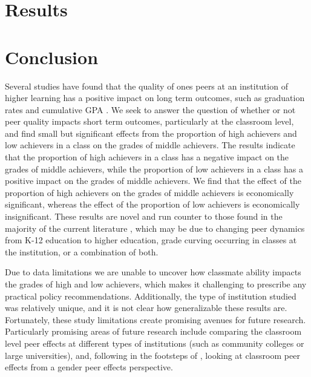 \documentclass[12pt,letterpaper,english,fleqn]{article}
\begin{document}


\section{Results}\label{results}



\section{Conclusion}\label{conclusion}


Several studies have found that the quality of ones peers at an institution of higher learning has a positive impact on long term outcomes, such as graduation rates and cumulative GPA \citep{smith2015new,luppino2015college,ost2010role}.
We seek to answer the question of whether or not peer quality impacts short term outcomes, particularly at the classroom level, and find small but significant effects from the proportion of high achievers and low achievers in a class on the grades of middle achievers. 
The results indicate that the proportion of high achievers in a class has a negative impact on the grades of middle achievers, while the proportion of low achievers in a class has a positive impact on the grades of middle achievers. 
We find that the effect of the proportion of high achievers on the grades of middle achievers is economically significant, whereas the effect of the proportion of low achievers is economically insignificant. 
These results are novel and run counter to those found in the majority of the current literature \citep{kang2007classroom,carman2012classroom,burke2013classroom,schlosser2008inside,lavy2012good}, which may be due to changing peer dynamics from K-12 education to higher education, grade curving occurring in classes at the institution, or a combination of both.
 
Due to data limitations we are unable to uncover how classmate ability impacts the grades of high and low achievers, which makes it challenging to prescribe any practical policy recommendations.
Additionally, the type of institution studied was relatively unique, and it is not clear how generalizable these results are. 
Fortunately, these study limitations create promising avenues for future research.
Particularly promising areas of future research include comparing the classroom level peer effects at different types of institutions (such as community colleges or large universities), and, following in the footsteps of \citet{oosterbeek2014gender}, looking at classroom peer effects from a gender peer effects perspective.
       
\newpage{}

\pagestyle{plain}
\singlespacing
{}


\clearpage{}

\pagestyle{fancy}
\begin{appendices}



\end{appendices}
\end{document}
